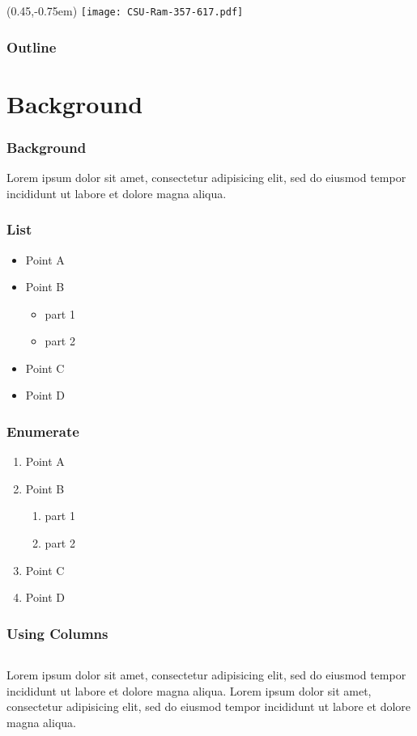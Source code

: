 \documentclass[xcolor=dvipsnames,10pt]{beamer}
\title{\TT}
\subtitle{}
\author{Aidan Winblad}
\institute{Colorado State University}
\date{\today}
\newcommand{\BG}{Background}
\begin{document}
  \begin{frame}
    \begin{textblock*}{100mm}(0.45\textwidth,-0.75em)
      \texttt{[image: CSU-Ram-357-617.pdf]}
    \end{textblock*}
  \titlepage
  \end{frame}

  \begin{frame}
  \frametitle{Outline}
  \tableofcontents
  \end{frame}

  \section{\BG}
  \begin{frame}
    \frametitle{\BG}
    Lorem ipsum dolor sit amet, consectetur adipisicing elit, sed do eiusmod tempor incididunt ut labore et dolore magna aliqua.
  \end{frame}

  \begin{frame}
  \frametitle{List}
  \begin{itemize}
  \item Point A
  \item Point B
  \begin{itemize}
  \item part 1
  \item part 2
  \end{itemize}
  \item Point C
  \item Point D
  \end{itemize}
  \end{frame}

  \begin{frame}
    \frametitle{Enumerate}
    \begin{enumerate}[]
  \item Point A
  \item Point B
  \begin{enumerate}[i]
  \item part 1
  \item part 2
  \end{enumerate}
  \item Point C
  \item Point D
  \end{enumerate}
  \end{frame}

  \begin{frame}
  \frametitle{Using Columns}
    \begin{columns}
      Lorem ipsum dolor sit amet, consectetur adipisicing elit, sed do eiusmod tempor incididunt ut labore et dolore magna aliqua.
      Lorem ipsum dolor sit amet, consectetur adipisicing elit, sed do eiusmod tempor incididunt ut labore et dolore magna aliqua.
    \end{columns}
  \end{frame}
\end{document}
